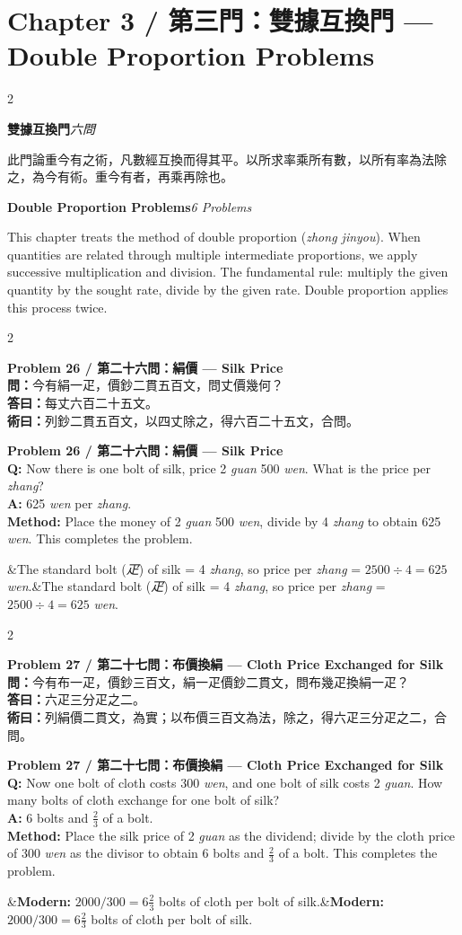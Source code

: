 \documentclass[11pt,a4paper]{article}
\newcommand{\bilingualproblem}[4]{%
  \begin{paracol}{2}
  \begin{leftcolumn}
  \noindent\textbf{\color{problemcolor}#1}\\[0.2cm]
  #2
  \end{leftcolumn}
  \switchcolumn
  \noindent\textbf{\color{problemcolor}#1}\\[0.2cm]
  #3
  \end{paracol}
  \ifx&#4&\else\vspace{0.3cm}\noindent#4\fi
  \vspace{0.5cm}
}
\newcommand{\wen}[1]{\textcolor{problemcolor}{\textbf{問：}}#1}
\newcommand{\da}[1]{\textcolor{answercolor}{\textbf{答曰：}}#1}
\newcommand{\shu}[1]{\textcolor{methodcolor}{\textbf{術曰：}}#1}
\newcommand{\wenen}[1]{\textcolor{problemcolor}{\textbf{Q:}} #1}
\newcommand{\daen}[1]{\textcolor{answercolor}{\textbf{A:}} #1}
\newcommand{\shuen}[1]{\textcolor{methodcolor}{\textbf{Method:}} #1}
\begin{document}
\newpage

\section{Chapter 3 / 第三門：雙據互換門 --- Double Proportion Problems}
\label{sec:shuangju}

\begin{paracol}{2}
\begin{leftcolumn}
\noindent\textbf{雙據互換門}\quad\textit{六問}

此門論重今有之術，凡數經互換而得其平。以所求率乘所有數，以所有率為法除之，為今有術。重今有者，再乘再除也。
\end{leftcolumn}

\switchcolumn

\noindent\textbf{Double Proportion Problems}\quad\textit{6 Problems}

This chapter treats the method of double proportion (\textit{zhong jinyou}). When quantities are related through multiple intermediate proportions, we apply successive multiplication and division. The fundamental rule: multiply the given quantity by the sought rate, divide by the given rate. Double proportion applies this process twice.
\end{paracol}

\vspace{0.5cm}

\bilingualproblem{Problem 26 / 第二十六問：絹價 --- Silk Price}{
\wen{今有絹一疋，價鈔二貫五百文，問丈價幾何？}\\[0.2cm]
\da{每丈六百二十五文。}\\[0.2cm]
\shu{列鈔二貫五百文，以四丈除之，得六百二十五文，合問。}
}{
\wenen{Now there is one bolt of silk, price 2 \textit{guan} 500 \textit{wen}. What is the price per \textit{zhang}?}\\[0.2cm]
\daen{625 \textit{wen} per \textit{zhang}.}\\[0.2cm]
\shuen{Place the money of 2 \textit{guan} 500 \textit{wen}, divide by 4 \textit{zhang} to obtain 625 \textit{wen}. This completes the problem.}
}{The standard bolt (\textit{疋}) of silk = 4 \textit{zhang}, so price per \textit{zhang} = $2500 \div 4 = 625$ \textit{wen}.}

\bilingualproblem{Problem 27 / 第二十七問：布價換絹 --- Cloth Price Exchanged for Silk}{
\wen{今有布一疋，價鈔三百文，絹一疋價鈔二貫文，問布幾疋換絹一疋？}\\[0.2cm]
\da{六疋三分疋之二。}\\[0.2cm]
\shu{列絹價二貫文，為實；以布價三百文為法，除之，得六疋三分疋之二，合問。}
}{
\wenen{Now one bolt of cloth costs 300 \textit{wen}, and one bolt of silk costs 2 \textit{guan}. How many bolts of cloth exchange for one bolt of silk?}\\[0.2cm]
\daen{6 bolts and $\frac{2}{3}$ of a bolt.}\\[0.2cm]
\shuen{Place the silk price of 2 \textit{guan} as the dividend; divide by the cloth price of 300 \textit{wen} as the divisor to obtain 6 bolts and $\frac{2}{3}$ of a bolt. This completes the problem.}
}{\textbf{Modern:} $2000 / 300 = 6\frac{2}{3}$ bolts of cloth per bolt of silk.}
\end{document}
